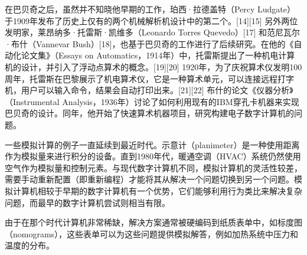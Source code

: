 在巴贝奇之后，虽然并不知晓他早期的工作，珀西·拉德盖特（Percy Ludgate）于1909年发布了历史上仅有的两个机械解析机设计中的第二个。[14][15] 另外两位发明家，莱昂纳多·托雷斯·凯维多（Leonardo Torres Quevedo）[17] 和范尼瓦尔·布什（Vannevar Bush）[18]，也基于巴贝奇的工作进行了后续研究。在他的《自动化论文集》（Essays on Automatics，1914年）中，托雷斯提出了一种机电计算机的设计，并引入了浮动点算术的概念。[19][20] 1920年，为了庆祝算术仪发明100周年，托雷斯在巴黎展示了机电算术仪，它是一种算术单元，可以连接远程打字机，用户可以输入命令，结果会自动打印出来。[21][22] 布什的论文《仪器分析》（Instrumental Analysis，1936年）讨论了如何利用现有的IBM穿孔卡机器来实现巴贝奇的设计。同年，他开始了快速算术机器项目，研究构建电子数字计算机的问题。

一些模拟计算的例子一直延续到最近时代。示意计（planimeter）是一种使用距离作为模拟量来进行积分的设备。直到1980年代，暖通空调（HVAC）系统仍然使用空气作为模拟量和控制元素。与现代数字计算机不同，模拟计算机的灵活性较差，需要手动重新配置（即重新编程）才能将其从解决一个问题切换到另一个问题。模拟计算机相较于早期的数字计算机有一个优势，它们能够利用行为类比来解决复杂问题，而最早的数字计算机尝试则相当有限。

由于在那个时代计算机非常稀缺，解决方案通常被硬编码到纸质表单中，如标度图（nomograms），这些表单可以为这些问题提供模拟解答，例如加热系统中压力和温度的分布。